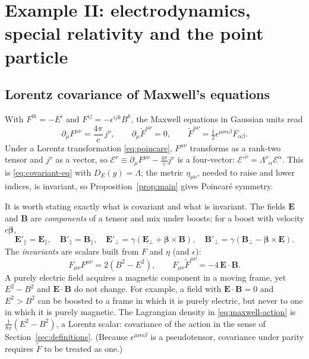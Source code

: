 \documentclass[11pt,a4paper,openany]{book}
\theoremstyle{definition}
\theoremstyle{plain}
\theoremstyle{remark}
\newcommand{\vE}{\bm{E}}
\newcommand{\vB}{\bm{B}}
\newcommand{\vbeta}{\bm{\beta}}
\begin{document}
\section{Example II: electrodynamics, special relativity and the point particle}
\label{sec:sr}

\subsection{Lorentz covariance of Maxwell's equations}

With $F^{0i}=-E^i$ and $F^{ij}=-\epsilon^{ijk}B^k$, the Maxwell equations in
Gaussian units read
\begin{equation}\label{eq:maxwell}
  \partial_\mu F^{\mu\nu}=\frac{4\pi}{c}\,j^\nu,\qquad
  \partial_\mu\tilde F^{\mu\nu}=0,\qquad
  \tilde F^{\mu\nu}=\tfrac12\epsilon^{\mu\nu\alpha\beta}F_{\alpha\beta}.
\end{equation}
Under a Lorentz transformation \eqref{eq:poincare}, $F^{\mu\nu}$ transforms as a
rank-two tensor and $j^\nu$ as a vector, so
$\mathcal E^\nu\equiv\partial_\mu F^{\mu\nu}-\tfrac{4\pi}{c}j^\nu$ is a
four-vector: $\mathcal E'^\nu=\Lambda^\nu{}_\alpha\mathcal E^\alpha$. This is
\eqref{eq:covariant-eq} with $D_E(g)=\Lambda$; the metric $\eta_{\mu\nu}$,
needed to raise and lower indices, is invariant, so Proposition~\ref{prop:main}
gives Poincar\'e symmetry.

It is worth stating exactly what is covariant and what is invariant.
The fields $\vE$ and $\vB$ are \emph{components} of a tensor and mix under
boosts; for a boost with velocity $c\vbeta$,
\begin{equation}\label{eq:boost-fields}
  \vE'_\parallel=\vE_\parallel,\quad \vB'_\parallel=\vB_\parallel,\quad
  \vE'_\perp=\gamma(\vE_\perp+\vbeta\times\vB),\quad
  \vB'_\perp=\gamma(\vB_\perp-\vbeta\times\vE).
\end{equation}
The \emph{invariants} are scalars built from $F$ and $\eta$ (and $\epsilon$):
\begin{equation}\label{eq:EM-invariants}
  F_{\mu\nu}F^{\mu\nu}=2(B^2-E^2),\qquad
  F_{\mu\nu}\tilde F^{\mu\nu}=-4\,\vE\!\cdot\!\vB .
\end{equation}
A purely electric field acquires a magnetic component in a moving frame, yet
$E^2-B^2$ and $\vE\!\cdot\!\vB$ do not change. For example, a field with
$\vE\!\cdot\!\vB=0$ and $E^2>B^2$ can be boosted to a frame in which it is
purely electric, but never to one in which it is purely magnetic. The
Lagrangian density in \eqref{eq:maxwell-action} is $\tfrac1{8\pi}(E^2-B^2)$, a
Lorentz scalar: covariance of the action in the sense of
Section~\ref{sec:definitions}. (Because $\epsilon^{\mu\nu\alpha\beta}$ is a
pseudotensor, covariance under parity requires $\tilde F$ to be treated as
one.)
\end{document}
